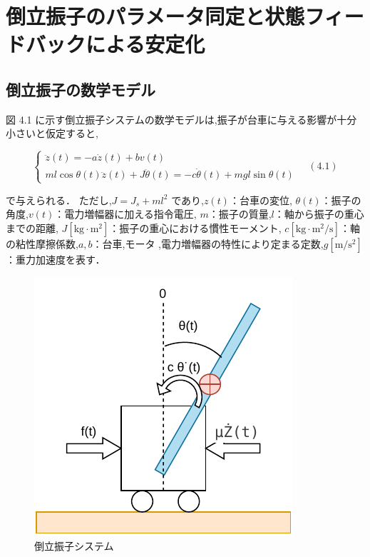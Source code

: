 

\section{倒立振子のパラメータ同定と状態フィードバックによる安定化}

\subsection{倒立振子の数学モデル}

図 4.1 に示す倒立振子システムの数学モデルは,振子が台車に与える影響が十分小さいと仮定すると,

\[
  \begin{cases}
    \ddot{z}(t) = -a\dot{z}(t) + bv(t) \\
    ml \cos\theta(t) \ddot{z}(t) + J\ddot{\theta}(t) = -c\dot{\theta}(t) + mgl \sin\theta(t)
  \end{cases}
  \quad (4.1)
\]

で与えられる．
ただし,\( J = J_s + ml^2 \) であり,\( z(t) \)：台車の変位,
\( \theta(t) \)：振子の角度,\( v(t) \)：電力増幅器に加える指令電圧,
\( m \)：振子の質量,\( l \)：軸から振子の重心までの距離,
\( J [\mathrm{kg\cdot m^2}] \)：振子の重心における慣性モーメント,
\( c [\mathrm{kg\cdot m^2/s}] \)：軸の粘性摩擦係数,\( a, b \)：台車,モータ
,電力増幅器の特性により定まる定数,\( g [\mathrm{m/s^2}] \)：重力加速度を表す．


\begin{figure}[h]
  \centering
  \includegraphics[scale=1]{sozai/1.pdf}
  \caption{ 倒立振子システム}
\end{figure}

